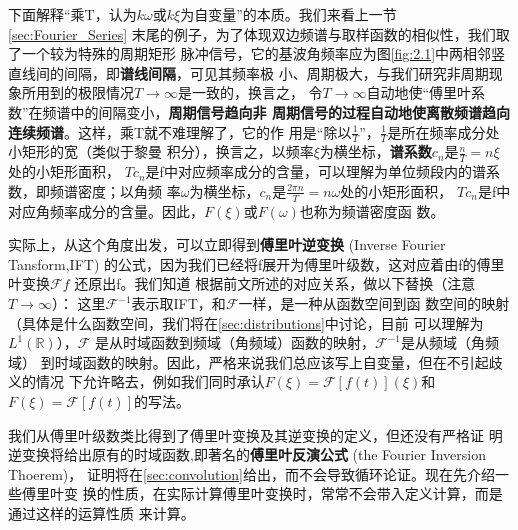 \documentclass{ctexbook}
\begin{document}
下面解释“乘T，认为$k\omega$或$k\xi$为自变量”的本质。我们来看上一节\ref{sec:Fourier_Series}
末尾的例子，为了体现双边频谱与取样函数的相似性，我们取了一个较为特殊的周期矩形
脉冲信号，它的基波角频率应为图\ref{fig:2.1}中两相邻竖直线间的间隔，即\textbf{谱线间隔}，可见其频率极
小、周期极大，与我们研究非周期现象所用到的极限情况$T\to\infty$是一致的，换言之，
令$T\to\infty$自动地使“傅里叶系数”在频谱中的间隔变小，\textbf{周期信号趋向非
    周期信号的过程自动地使离散频谱趋向连续频谱}。这样，乘T就不难理解了，它的作
用是“除以$\frac{1}{T}$”，$\frac{1}{T}$是所在频率成分处小矩形的宽（类似于黎曼
积分），换言之，以频率$\xi$为横坐标，\textbf{谱系数}$c_n$是$\frac{n}{T}=n\xi$处的小矩形面积，
$Tc_n$是f中对应频率成分的含量，可以理解为单位频段内的谱系数，即频谱密度；以角频
率$\omega$为横坐标，$c_n$是$\frac{2\pi n}{T}=n\omega$处的小矩形面积，
$Tc_n$是f中对应角频率成分的含量。因此，$F(\xi)$或$F(\omega)$也称为频谱密度函
数。

实际上，从这个角度出发，可以立即得到\textbf{傅里叶逆变换} (Inverse Fourier Tansform,IFT)
的公式，因为我们已经将f展开为傅里叶级数，这对应着由f的傅里叶变换$\mathcal{F} f$
还原出f。我们知道
根据前文所述的对应关系，做以下替换（注意$T\to\infty$）：
这里$\mathcal{F} ^{-1}$表示取IFT，和$\mathcal{F} $一样，是一种从函数空间到函
数空间的映射（具体是什么函数空间，我们将在\ref{sec:distributions}中讨论，目前
可以理解为$L^1(\mathbb{R})$），$\mathcal{F} $
是从时域函数到频域（角频域）函数的映射，$\mathcal{F} ^{-1}$是从频域（角频域）
到时域函数的映射。因此，严格来说我们总应该写上自变量，但在不引起歧义的情况
下允许略去，例如我们同时承认$F(\xi)=\mathcal{F} [f(t)](\xi)$和
$F(\xi)=\mathcal{F} [f(t)]$的写法。

我们从傅里叶级数类比得到了傅里叶变换及其逆变换的定义，但还没有严格证
明逆变换将给出原有的时域函数,即著名的\textbf{傅里叶反演公式} (the Fourier Inversion Thoerem)，
证明将在\ref{sec:convolution}给出，而不会导致循环论证。现在先介绍一些傅里叶变
换的性质，在实际计算傅里叶变换时，常常不会带入定义计算，而是通过这样的运算性质
来计算。
\end{document}
